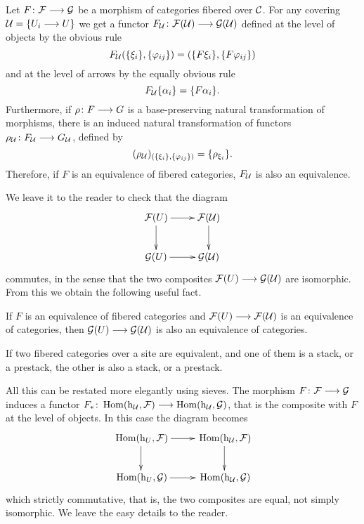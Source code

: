 \begin{4   STACKS}
\begin{4.1 Descent of objects of fibcats}
Let $F \colon \cF \arr \cG$ be a morphism of categories fibered over $\mathcal{C}$. For any covering $\mathcal{U} = \{U_{i} \longrightarrow U\}$ we get a functor $F_{\cU} \colon \cF(\cU) \arr \cG(\cU)$ defined at the level of objects by the obvious rule
   \[
   F_{\mathcal{U}}(\{\xi_{i}\}, \{\varphi_{ij}\}) = (\{F\xi_{i}\}, \{F\varphi_{ij}\})
   \]
and at the level of arrows by the equally obvious rule
   \[
   F_{\mathcal{U}}\{\alpha_{i}\} = \{F\alpha_{i}\}.
   \]
Furthermore, if $\rho \colon F \arr G$ is a base-preserving natural transformation of morphisms, there is an induced natural transformation of functors $\rho_{\cU} \colon F_{\cU} \arr G_{\cU}$, defined by
   \[
   (\rho_{\mathcal{U}})_{(\{\xi_{i}\}, \{\varphi_{ij}\})} = \{\rho_{\xi_{i}}\}.
   \]
Therefore, if $F$ is an equivalence of fibered categories, $F_{\mathcal{U}}$ is also an equivalence.

We leave it to the reader to check that the diagram 
   \[
   \xymatrix{
   {}\cF(U) \ar[r]\ar[d] & {}\cF(\cU)\ar[d] \\
   {}\cG(U) \ar[r]       & {}\cG(\cU)
   }
   \]
commutes, in the sense that the two composites $\cF(U) \arr \cG(\cU)$ are isomorphic. From this we obtain the following useful fact.

\begin{proposition}\label{prop:equivtostack->stack}\hfil

\begin{enumeratea}

\item If $F$ is an equivalence of fibered categories and $\cF(U) \arr \cF(\cU)$ is an equivalence of categories, then $\cG(U) \arr \cG(\cU)$ is also an equivalence of categories.

\item If two fibered categories over a site are equivalent, and one of them is a stack, or a prestack, the other is also a stack, or a prestack.

\end{enumeratea}
\end{proposition}

All this can be restated more elegantly using sieves. The morphism $F \colon \cF \arr \cG$ induces a functor $F_{*} \colon \hom(\h_{\cU}, \cF) \arr \hom(\h_{\cU}, \cG)$, that is the composite with $F$ at the level of objects. In this case the diagram becomes
   \[
   \xymatrix{
   {}\hom(\h_{U}, \cF) \ar[r]\ar[d] & {}\hom(\h_{\cU}, \cF)\ar[d] \\
   {}\hom(\h_{U}, \cG) \ar[r]       & {}\hom(\h_{\cU}, \cG)
   }
   \]
which strictly commutative, that is, the two composites are equal, not simply isomorphic. We leave the easy details to the reader.


\end{4.1 Descent of objects of fibcats}
\end{4   STACKS}
